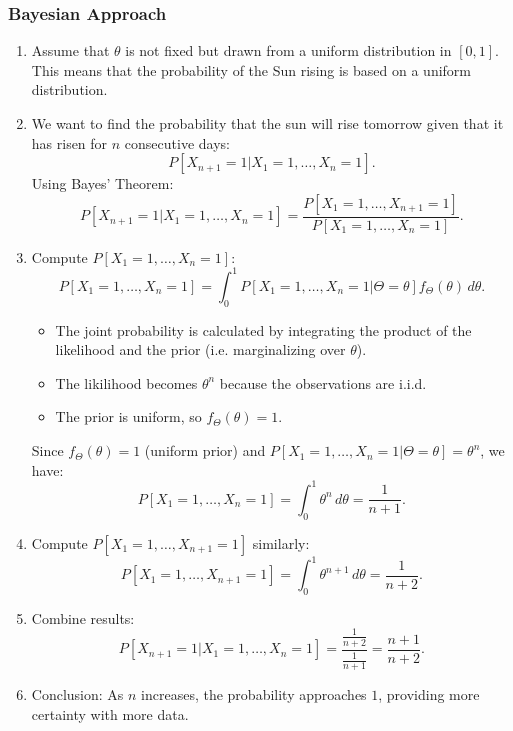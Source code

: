 \subsubsection{Bayesian Approach}
\begin{example}
    \begin{enumerate}
        \item Assume that $\theta$ is not fixed but drawn from a uniform distribution in $[0, 1]$. This means that the probability of the Sun rising is based on a uniform distribution.
        \item We want to find the probability that the sun will rise tomorrow given that it has risen for $n$ consecutive days:
        \[
        P[X_{n+1} = 1 | X_1 = 1, \dots, X_n = 1].
        \]
        Using Bayes' Theorem:
        \[
        P[X_{n+1} = 1 | X_1 = 1, \dots, X_n = 1] = \frac{P[X_1 = 1, \dots, X_{n+1} = 1]}{P[X_1 = 1, \dots, X_n = 1]}.
        \]
        \item Compute $P[X_1 = 1, \dots, X_n = 1]$:
        \[
        P[X_1 = 1, \dots, X_n = 1] = \int_0^1 P[X_1 = 1, \dots, X_n = 1 | \Theta = \theta] f_\Theta(\theta) \, d\theta.
        \]
        \begin{itemize}
            \item The joint probability is calculated by integrating the product of the likelihood and the prior (i.e. marginalizing over $\theta$).
            \item The likilihood becomes $\theta^n$ because the observations are i.i.d.
            \item The prior is uniform, so $f_\Theta(\theta) = 1$.
        \end{itemize}
        Since $f_\Theta(\theta) = 1$ (uniform prior) and $P[X_1 = 1, \dots, X_n = 1 | \Theta = \theta] = \theta^n$, we have:
        \[
        P[X_1 = 1, \dots, X_n = 1] = \int_0^1 \theta^n \, d\theta = \frac{1}{n+1}.
        \]
        \item Compute $P[X_1 = 1, \dots, X_{n+1} = 1]$ similarly:
        \[
        P[X_1 = 1, \dots, X_{n+1} = 1] = \int_0^1 \theta^{n+1} \, d\theta = \frac{1}{n+2}.
        \]
        \item Combine results:
        \[
        P[X_{n+1} = 1 | X_1 = 1, \dots, X_n = 1] = \frac{\frac{1}{n+2}}{\frac{1}{n+1}} = \frac{n+1}{n+2}.
        \]
        \item Conclusion: As $n$ increases, the probability approaches $1$, providing more certainty with more data.
    \end{enumerate}
\end{example}
